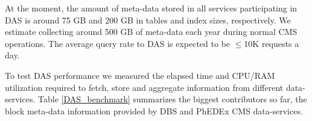 \documentclass[3p,times]{elsarticle}
\begin{document}


At the moment, the amount of meta-data stored in all services participating
in DAS is around
75 GB and 200 GB in tables and index sizes, respectively. We estimate 
collecting around 500 GB of meta-data each year during 
normal CMS operations. The average query rate to DAS is expected to be
$\leq$10K requests a day.

To test DAS performance we measured the elapsed time and CPU/RAM utilization
required to fetch, store and aggregate information from different
data-services. Table \ref{DAS_benchmark} summarizes the biggest 
contributors so far, the block meta-data information provided by DBS and 
PhEDEx CMS data-services. 
\end{document}
